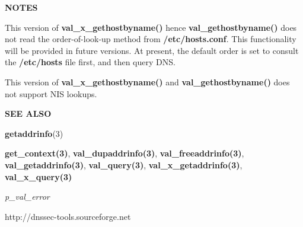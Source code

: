 {\bf NOTES}

This version of {\bf val\_x\_gethostbyname()} hence {\bf val\_gethostbyname()}
does not read the order-of-look-up method from {\bf /etc/hosts.conf}.  This
functionality will be provided in future versions.  At present, the default
order is set to consult the {\bf /etc/hosts} file first, and then query DNS.

This version of {\bf val\_x\_gethostbyname()} and {\bf val\_gethostbyname()}
does not support NIS lookups.

{\bf SEE ALSO}

{\bf getaddrinfo}(3)

{\bf get\_context(3)}, {\bf val\_dupaddrinfo(3)}, {\bf val\_freeaddrinfo(3)},\\
{\bf val\_getaddrinfo(3)}, {\bf val\_query(3)}, {\bf val\_x\_getaddrinfo(3)},\\
{\bf val\_x\_query(3)}

{\it p\_val\_error}

http://dnssec-tools.sourceforge.net

